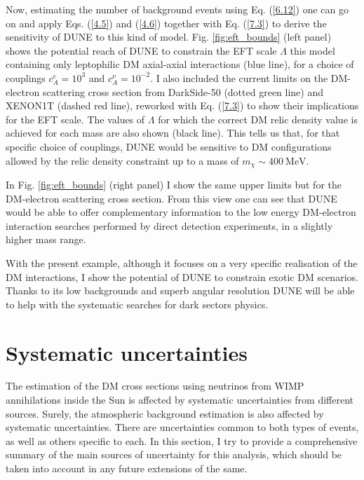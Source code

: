 Now, estimating the number of background events using Eq. (\ref{6.12}) one can go on and apply Eqs. (\ref{4.5}) and (\ref{4.6}) together with Eq. (\ref{7.3}) to derive the sensitivity of DUNE to this kind of model. Fig. \ref{fig:eft_bounds} (left panel) shows the potential reach of DUNE to constrain the EFT scale $\Lambda$ this model containing only leptophilic DM axial-axial interactions (blue line), for a choice of couplings $c_{A}^{e} = 10^{3}$ and $c_{A}^{\nu} = 10^{-2}$. I also included the current limits on the DM-electron scattering cross section from DarkSide-50 \cite{DarkSide2018} (dotted green line) and XENON1T \cite{XENON2019} (dashed red line), reworked with Eq. (\ref{7.3}) to show their implications for the EFT scale. The values of $\Lambda$ for which the correct DM relic density value is achieved for each mass are also shown (black line). This tells us that, for that specific choice of couplings, DUNE would be sensitive to DM configurations allowed by the relic density constraint up to a mass of $m_{\chi} \sim 400 \ \mathrm{MeV}$.

In Fig. \ref{fig:eft_bounds} (right panel) I show the same upper limits but for the DM-electron scattering cross section. From this view one can see that DUNE would be able to offer complementary information to the low energy DM-electron interaction searches performed by direct detection experiments, in a slightly higher mass range.

With the present example, although it focuses on a very specific realisation of the DM interactions, I show the potential of DUNE to constrain exotic DM scenarios. Thanks to its low backgrounds and superb angular resolution DUNE will be able to help with the systematic searches for dark sectors physics.

\section{Systematic uncertainties}

The estimation of the DM cross sections using neutrinos from WIMP annihilations inside the Sun is affected by systematic uncertainties from different sources. Surely, the atmospheric background estimation is also affected by systematic uncertainties. There are uncertainties common to both types of events, as well as others specific to each. In this section, I try to provide a comprehensive summary of the main sources of uncertainty for this analysis, which should be taken into account in any future extensions of the same.

